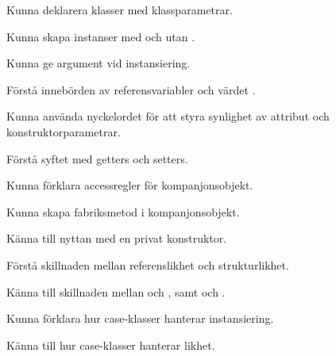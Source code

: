 

\item Kunna deklarera klasser med klassparametrar.
\item Kunna skapa instanser med och utan .
\item Kunna ge argument vid instansiering.
\item Förstå innebörden av referensvariabler och värdet .

\item Kunna använda nyckelordet  för att styra synlighet av attribut och konstruktorparametrar.

\item Förstå syftet med getters och setters.
\item Kunna förklara accessregler för kompanjonsobjekt.
\item Kunna skapa fabriksmetod i kompanjonsobjekt.
\item Känna till nyttan med en privat konstruktor.

\item Förstå skillnaden mellan referenslikhet och strukturlikhet.
\item Känna till skillnaden mellan \code{==} och , samt \code{!=} och .

\item Kunna förklara hur case-klasser hanterar instansiering.
\item Känna till hur case-klasser hanterar likhet.
